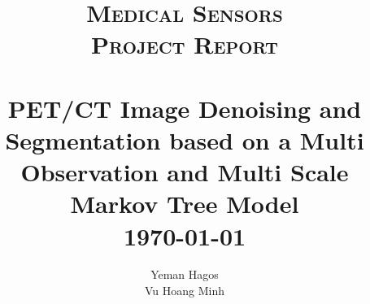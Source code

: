 \title{ \textsc{\textbf{Medical Sensors}}
		\\ [0.5cm] 
		\normalsize \textsc{Project Report}
		\\
		[2.0cm]
		\HRule{0.5pt} \\
		\LARGE \textbf{PET/CT Image Denoising and Segmentation based on a Multi Observation and Multi Scale Markov Tree Model}
		\HRule{2pt} \\ [0.5cm]
		\normalsize \today \vspace*{5\baselineskip}}

\date{}

\author{
		Yeman Hagos \\
		Vu Hoang Minh \\ }

\maketitle
\tableofcontents
\newpage

\sectionfont{\scshape}
